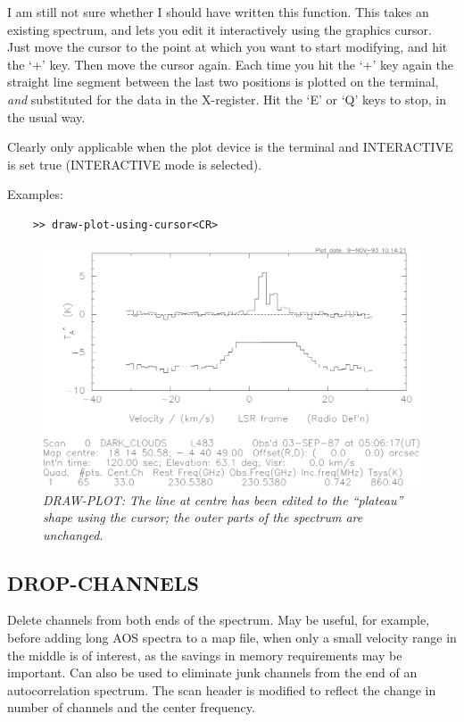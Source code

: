 \documentclass[11pt,twoside]{report}
\begin{document}
I am still not sure whether I should have written this function. This
takes an existing spectrum, and lets you edit it interactively using the
graphics cursor. Just move the cursor to the point at which you want to
start modifying, and hit the `+' key. Then move the cursor again. Each time
you hit the `+' key again the straight line segment between the last two
positions is plotted on the terminal, {\em and} substituted for the data
in the X-register. Hit the `E' or `Q' keys to stop, in the usual way.

Clearly only applicable when the plot device is the terminal and 
INTERACTIVE is set true (\ie INTERACTIVE mode is selected).

Examples:
\begin{verbatim}
    >> draw-plot-using-cursor<CR>
\end{verbatim}

\begin{figure}[htbp]
\begin{center}
\includegraphics[scale=0.65]{draw-plot.ps}
\protect\parbox{5.5in}
{\caption[DRAW]
{\sl
DRAW-PLOT: The line at centre has been edited to the ``plateau'' shape
using the cursor; the outer parts of the spectrum are unchanged.
\label{DRAW}
}
}
\end{center}
\end{figure}

\subsection{DROP-CHANNELS} 

Delete channels from both ends of the spectrum. May be useful, for example,
before adding long AOS spectra to a map file, when only a small velocity
range in the middle is of interest, as the savings in memory requirements
may be important. Can also be used to eliminate junk channels 
 from the end
of an autocorrelation spectrum. The scan header is modified to reflect
the change in number of channels and the center frequency.
\end{document}
